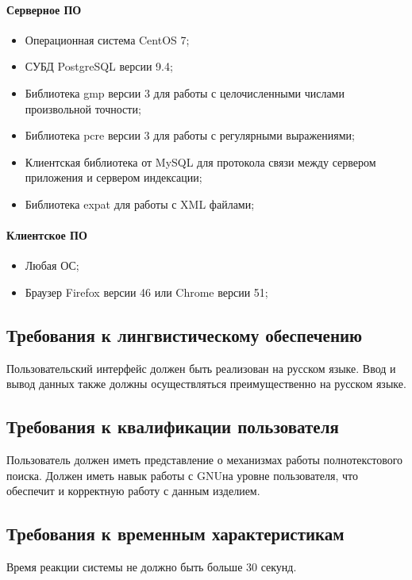 \documentclass[russian,utf8,emptystyle]{eskdtext}
\begin{document}
\paragraph*{Серверное ПО} \hfill

\begin{itemize}
\item Операционная система CentOS 7;
\item СУБД PostgreSQL версии 9.4;
\item Библиотека gmp версии 3 для работы с целочисленными числами произвольной точности;
\item Библиотека pcre версии 3 для работы с регулярными выражениями;
\item Клиентская библиотека от MySQL для протокола связи между сервером приложения и сервером индексации;
\item Библиотека expat для работы с XML файлами;
\end{itemize}

\paragraph*{Клиентское ПО} \hfill

\begin{itemize}
\item Любая ОС;
\item Браузер Firefox версии 46 или Chrome версии 51;
\end{itemize}

\subsection{Требования к лингвистическому обеспечению}

Пользовательский интерфейс должен быть реализован на русском языке. Ввод и вывод данных также должны осуществляться преимущественно на русском языке.

\subsection{Требования к квалификации пользователя}

Пользователь должен иметь представление о механизмах работы полнотекстового поиска. Должен иметь навык работы с GNU\Linux на уровне пользователя, что обеспечит и корректную работу с данным изделием.

\subsection{Требования к временным характеристикам}
Время реакции системы не должно быть больше 30 секунд.
\end{document}

